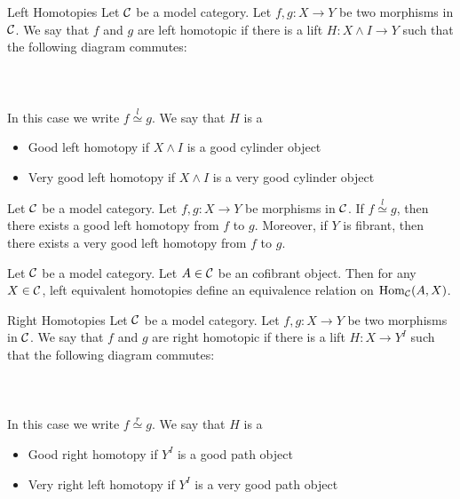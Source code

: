 \documentclass[a4paper]{article}
\begin{document}
\begin{defn}{Left Homotopies}{} Let $\mathcal{C}$ be a model category. Let $f,g:X\to Y$ be two morphisms in $\mathcal{C}$. We say that $f$ and $g$ are left homotopic if there is a lift $H:X\wedge I\to Y$ such that the following diagram commutes: \\~\\
\\~\\
In this case we write $f\overset{l}{\simeq}g$. We say that $H$ is a 
\begin{itemize}
\item Good left homotopy if $X\wedge I$ is a good cylinder object
\item Very good left homotopy if $X\wedge I$ is a very good cylinder object
\end{itemize}
\end{defn}

\begin{prp}{}{} Let $\mathcal{C}$ be a model category. Let $f,g:X\to Y$ be morphisms in $\mathcal{C}$. If $f\overset{l}{\simeq}g$, then there exists a good left homotopy from $f$ to $g$. Moreover, if $Y$ is fibrant, then there exists a very good left homotopy from $f$ to $g$. 
\end{prp}

\begin{prp}{}{} Let $\mathcal{C}$ be a model category. Let $A\in\mathcal{C}$ be an cofibrant object. Then for any $X\in\mathcal{C}$, left equivalent homotopies define an equivalence relation on $\operatorname{Hom}_{\mathcal{C}}(A,X)$. 
\end{prp}

\begin{defn}{Right Homotopies}{} Let $\mathcal{C}$ be a model category. Let $f,g:X\to Y$ be two morphisms in $\mathcal{C}$. We say that $f$ and $g$ are right homotopic if there is a lift $H:X\to Y^I$ such that the following diagram commutes: \\~\\
\\~\\
In this case we write $f\overset{r}{\simeq}g$. We say that $H$ is a 
\begin{itemize}
\item Good right homotopy if $Y^I$ is a good path object
\item Very right left homotopy if $Y^I$ is a very good path object
\end{itemize}
\end{defn}
\end{document}
